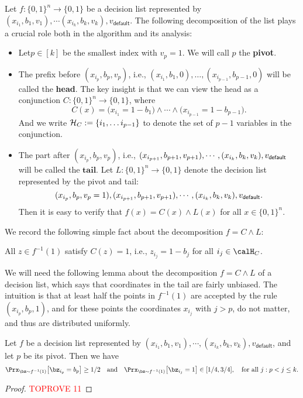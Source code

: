 \documentclass[11pt]{article}
\theoremstyle{definition}
\begin{document}
Let $f:\{0,1\}^n\rightarrow \{0,1\}$ be a decision list
  represented by $(x_{i_1}, b_1,v_1),\cdots (x_{i_k}, b_k,v_k), v_{\textsf{default}}$.
The following decomposition of the list plays a crucial role both in the algorithm and its analysis:
\begin{flushleft}\begin{itemize}
    \item Let$p\in [k]$ be the smallest index with $v_p = 1$. We will call $p$ the \textbf{pivot}. 
    \item The prefix before $(x_{i_p},b_p,v_{p})$, i.e., $(x_{i_1}, b_1, 0), \ldots, (x_{i_{p-1}}, b_{p-1}, 0)$ will be called the \textbf{head}. The key insight is that we can view the head as a conjunction $C:\{0,1\}^n\rightarrow \{0,1\}$, where $$C(x)= \big(x_{i_1}=1-b_1\big) \land \cdots \land \big(x_{i_{p-1}} = 1-b_{p-1}\big).$$ 
    And we write ${\cal H}_C:=\{{i_1}, \ldots {i_{p-1}}\}$ to denote the set of $p-1$
     variables in the conjunction.
\item The part after $(x_{i_p},b_p,v_p)$, i.e., $(x_{i_{p+1}}, b_{p+1}, v_{p+1}),\cdots,(x_{i_k},b_k,v_k), v_{\mathsf{default}}$ will be called the $\textbf{tail}$.
Let $L:\{0,1\}^n\rightarrow \{0,1\}$ denote
  the decision list represented by the pivot and tail:
 $$(x_{i_p}, b_p,v_p=1),(x_{i_{p+1}}, b_{p+1},v_{p+1}), \cdots,(x_{i_k},b_k,v_k), v_{\mathsf{default}}.$$
Then it is easy to verify that $f(x)=C(x)\land L(x)$ for all $x\in \{0,1\}^n$.
\end{itemize}\end{flushleft}

We record the following simple fact  
  about the decomposition $f=C\land L$:

\begin{observation}\label{ob:simple1}
All $z\in f^{-1}(1)$ satisfy $C(z)=1$, i.e.,
  $z_{i_j}=1-b_j$ for all $i_j\in \calH_C$.
\end{observation}



We will need the following lemma about the decomposition $f=C\land L$ of a decision list, which says that coordinates in the tail are fairly unbiased. The intuition is that at least half the points in $f^{-1}(1)$ are accepted by the rule $(x_{i_p} , b_{p}, 1)$, and for these points the coordinates $x_{i_j}$ with $j>p$, do not matter, and thus are distributed uniformly. 
\begin{lemma}\label{lem: low bias tail}
    Let $f$ be a decision list represented
    by $(x_{i_1},b_1,v_1),\cdots,(x_{i_k},b_k,v_k),v_{\textsf{default}}$, and let $p$ be its pivot. 
    Then we have
\begin{equation*}\Prx_{\bz \sim f^{-1}(1)}\big[\bz_{i_p}=b_p\big] \geq 1/2\quad\text{and}\quad
    \Prx_{\bz \sim f^{-1}(1)}\big[\bz_{i_j}=1\big] \in [1/4, 3/4],\quad\text{for all $j:p<j\le k$.}
\end{equation*}
\end{lemma}
\begin{proof}\textcolor{red}{TOPROVE 11}\end{proof}
\end{document}
